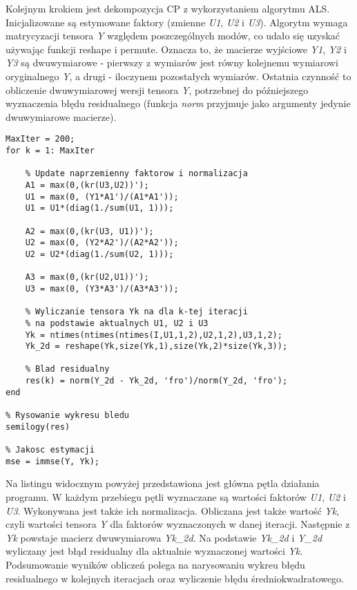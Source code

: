 Kolejnym krokiem jest dekompozycja CP z wykorzystaniem algorytmu ALS. Inicjalizowane są estymowane faktory (zmienne \textit{U1}, \textit{U2} i \textit{U3}). Algorytm wymaga matrycyzacji tensora \textit{Y} względem poszczególnych modów, co udało się uzyskać używając funkcji reshape i permute. Oznacza to, że macierze wyjściowe \textit{Y1}, \textit{Y2} i \textit{Y3} są dwuwymiarowe - pierwszy z wymiarów jest równy kolejnemu wymiarowi oryginalnego \textit{Y}, a drugi - iloczynem pozostałych wymiarów. Ostatnia czynność to obliczenie dwuwymiarowej wersji tensora \textit{Y}, potrzebnej do późniejszego wyznaczenia błędu residualnego (funkcja \textit{norm} przyjmuje jako argumenty jedynie dwuwymiarowe macierze).\\

\vspace{5mm}
\begin{minipage}{\linewidth}
\begin{lstlisting}[linewidth=14.5cm]
MaxIter = 200;
for k = 1: MaxIter

	% Update naprzemienny faktorow i normalizacja
	A1 = max(0,(kr(U3,U2))');    
	U1 = max(0, (Y1*A1')/(A1*A1'));
	U1 = U1*(diag(1./sum(U1, 1)));
	
	A2 = max(0,(kr(U3, U1))');    
	U2 = max(0, (Y2*A2')/(A2*A2'));
	U2 = U2*(diag(1./sum(U2, 1)));
	
	A3 = max(0,(kr(U2,U1))');
	U3 = max(0, (Y3*A3')/(A3*A3'));
	
	% Wyliczanie tensora Yk na dla k-tej iteracji
	% na podstawie aktualnych U1, U2 i U3
	Yk = ntimes(ntimes(ntimes(I,U1,1,2),U2,1,2),U3,1,2);
	Yk_2d = reshape(Yk,size(Yk,1),size(Yk,2)*size(Yk,3));
	
	% Blad residualny
	res(k) = norm(Y_2d - Yk_2d, 'fro')/norm(Y_2d, 'fro');
end

% Rysowanie wykresu bledu
semilogy(res)

% Jakosc estymacji
mse = immse(Y, Yk);
\end{lstlisting}
\end{minipage}
\vspace{5mm}

Na listingu widocznym powyżej przedstawiona jest główna pętla działania programu. W każdym przebiegu pętli wyznaczane są wartości faktorów \textit{U1}, \textit{U2} i \textit{U3}. Wykonywana jest także ich normalizacja. Obliczana jest także wartość \textit{Yk}, czyli wartości tensora \textit{Y} dla faktorów wyznaczonych w danej iteracji. Następnie z \textit{Yk} powstaje macierz dwuwymiarowa \textit{Yk\_2d}. Na podstawie \textit{Yk\_2d} i \textit{Y\_2d} wyliczany jest błąd residualny dla aktualnie wyznaczonej wartości \textit{Yk}.\\
Podsumowanie wyników obliczeń polega na narysowaniu wykreu błędu residualnego w kolejnych iteracjach oraz wyliczenie błędu średniokwadratowego.

